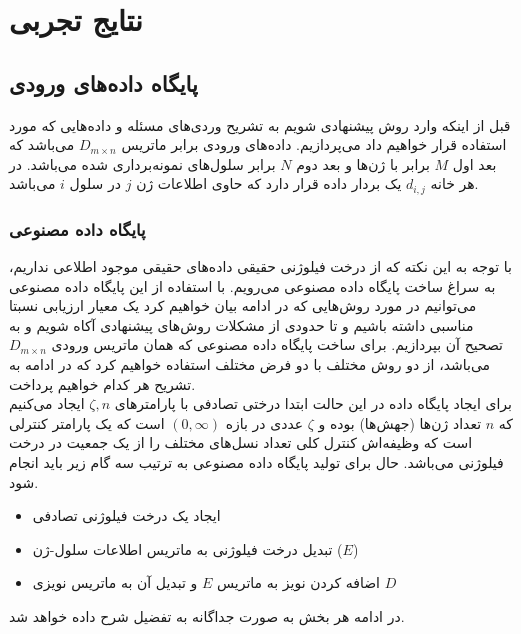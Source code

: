 
\chapter{نتایج تجربی}

\section{پایگاه داده‌های ورودی}
قبل از اینکه وارد روش پیشنهادی شویم به تشریح وردی‌های مسئله و داده‌هایی که مورد استفاده قرار خواهیم داد می‌پردازیم.
داده‌های ورودی برابر ماتریس $D_{m\times n}$ می‌باشد که بعد اول $M$ برابر با ژن‌ها و بعد دوم $N$ برابر سلول‌های نمونه‌برداری شده می‌باشد. در هر خانه $d_{i,j}$ یک بردار داده قرار دارد که حاوی اطلاعات ژن $j$ در سلول $i$ می‌باشد.

\subsection[پایگاه داده مصنوعی]
{پایگاه داده مصنوعی
}

با توجه به این نکته که از درخت فیلوژنی حقیقی داده‌های حقیقی موجود اطلاعی نداریم، به سراغ ساخت پایگاه‌ داده مصنوعی می‌رویم. با استفاده از این پایگاه داده مصنوعی می‌توانیم در مورد روش‌هایی که در ادامه بیان خواهیم کرد یک معیار ارزیابی نسبتا مناسبی داشته باشیم و تا حدودی از مشکلات روش‌های پیشنهادی آکاه شویم و به تصحیح آن بپردازیم. برای ساخت پایگاه داده مصنوعی که همان ماتریس ورودی $D_{m\times n}$ می‌باشد، از دو روش مختلف با دو فرض مختلف استفاده خواهیم کرد که در ادامه به تشریح هر کدام خواهیم پرداخت.
\\
برای ایجاد پایگاه داده در این حالت ابتدا درختی تصادفی با پارامترهای $\zeta, n$ ایجاد می‌کنیم که $n$ تعداد ژن‌ها (جهش‌ها) بوده و $\zeta$ عددی در بازه $(0, \infty)$ است که یک پارامتر کنترلی است که وظیفه‌اش کنترل کلی تعداد نسل‌های مختلف را از یک جمعیت در درخت فیلوژنی می‌باشد.
حال برای تولید پایگاه داده مصنوعی به ترتیب سه گام زیر باید انجام شود.
\begin{itemize}
	\item ایجاد یک درخت فیلوژنی تصادفی
	\item تبدیل درخت فیلوژنی به ماتریس اطلاعات سلول-ژن ($E$)
	\item اضافه کردن نویز به ماتریس $E$ و تبدیل آن به ماتریس نویزی $D$
\end{itemize}
در ادامه هر بخش به صورت جداگانه به تفضیل شرح داده خواهد شد.

